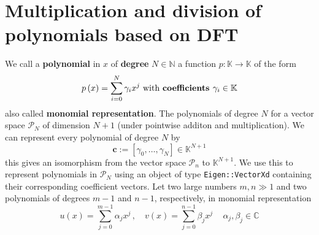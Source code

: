 \documentclass{article}
\begin{document}
\section*{Multiplication and division of polynomials based on DFT}

We call a \textbf{polynomial} in $x$ of \textbf{degree} $N \in\mathbb{N}$ a function $p : \mathbb{K} \to \mathbb{K}$ of the form 
\begin{equation*}
    p\left(x\right) = \sum_{i=0}^{N}\gamma_{i}x^{j} \text{ with \textbf{coefficients }} \gamma_{i} \in \mathbb{K}
\end{equation*}
also called \textbf{monomial representation}. The polynomials of degree $N$ for a vector space $\mathcal{P}_{N}$ of dimension $N+1$ (under pointwise additon and multiplication). We can represent every polynomial of degree $N$ by
\begin{equation*}
    \mathbf{c} := \left[\gamma_{0}, \dots, \gamma_{N}\right] \in \mathbb{K}^{N+1}
\end{equation*}
this gives an isomorphism from the vector space $\mathcal{P}_{n}$ to $\mathbb{K}^{N+1}$. We use this to represent polynomials in $\mathcal{P}_{N}$ using an object of type \verb|Eigen::VectorXd| containing their corresponding coefficient vectors. Let two large numbers $m,n \gg 1$ and two polynomials of degrees $m-1$ and $n-1$, respectively, in monomial representation
\begin{equation*}
    u\left(x\right) = \sum_{j=0}^{m-1}\alpha_{j}x^{j}\,,\quad v\left(x\right) = \sum_{j=0}^{n-1}\beta_{j}x^{j}\, \quad \alpha_{j},\beta_{j}\in \mathbb{C}
\end{equation*}
\end{document}
